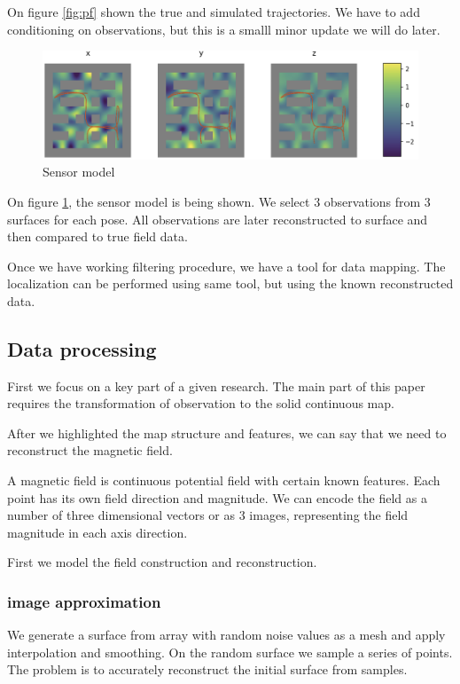 \documentclass[a4paper, 12pt]{article}
\begin{document}
On figure \ref{fig:pf} shown the true and simulated trajectories.
We have to add conditioning on observations, but this is a smalll minor update we will do later.

\begin{figure}
	\centering
	\includegraphics[width=0.99\linewidth]{images/Figure_1erhawrhser}
	\caption{Sensor model}
	\label{fig:Sensor_model}
\end{figure}

On figure \ref{fig:Sensor_model}, the sensor model is being shown.
We select 3 observations from 3 surfaces for each pose. All observations are later reconstructed to surface and then compared to true field data.

Once we have working filtering procedure, we have a tool for data mapping. The localization can be performed using same tool, but using the known reconstructed data.

\subsection{Data processing}

First we focus on a key part of a given research. The main part of this paper requires the transformation of observation to the solid continuous map.

After we highlighted the map structure and features, we can say that we need to reconstruct the magnetic field.

A magnetic field is continuous potential field with certain known features. Each point has its own field direction and magnitude.
We can encode the field as a number of three dimensional vectors or as 3 images, representing the field magnitude in each axis direction.

First we model the field construction and reconstruction. 

\subsubsection{image approximation}

We generate a surface from array with random noise values as a mesh and apply interpolation and smoothing.
On the random surface we sample a series of points. The problem is to accurately reconstruct the initial surface from samples.
\end{document}
